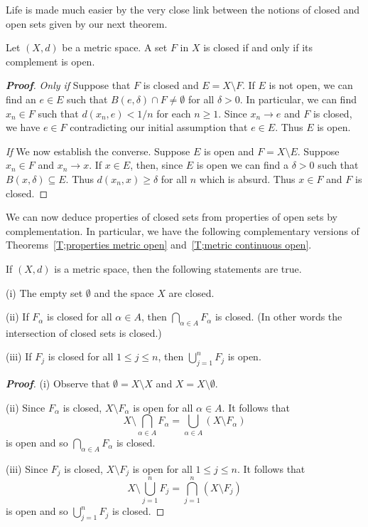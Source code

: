 Life is made much easier by the very close link between
the notions of closed and open sets given by our next theorem.


\begin{theorem}\label{T;closed complements open}
Let $(X,d)$ be a metric space. A set $F$ in $X$
is closed if and only if its complement is open.
\end{theorem}
\begin{proof}[\bf Proof]\emph{Only if} Suppose that
$F$ is closed and $E=X\setminus F$.
If $E$ is not open, we can find an $e\in E$ such that
$B(e,\delta)\cap F\neq\emptyset$ for all $\delta>0$.
In particular, we can find $x_{n}\in F$ such that $d(x_{n},e)<1/n$
for each $n\geq 1$. Since $x_{n}\rightarrow e$ and $F$ is closed,
we have $e\in F$ contradicting our initial assumption that
$e\in E$. Thus $E$ is open.

\emph{If} We now establish the converse. Suppose $E$ is open
and $F=X\setminus E$. Suppose $x_{n}\in F$ and $x_{n}\rightarrow x$.
If $x\in E$, then, since $E$ is open
 we can find a $\delta>0$ such that $B(x,\delta)\subseteq E$.
Thus $d(x_{n},x)\geq \delta$ for all $n$ which is absurd.
Thus $x\in F$ and $F$ is closed.
\end{proof}

We can now deduce properties of closed sets from properties of open sets by complementation. In particular, we have the following complementary versions of Theorems~\ref{T;properties metric open} and~\ref{T;metric continuous open}.




\begin{theorem}\label{T;properties metric closed} 
If $(X,d)$ is a metric space, 
then the following statements are true.

(i) The empty set $\emptyset$ and the space $X$ are closed.

(ii) If $F_{\alpha}$ is closed for all $\alpha\in A$, then
$\bigcap_{\alpha\in A} F_{\alpha}$ is closed. (In other words
the intersection of closed sets is closed.)

(iii) If $F_{j}$ is closed for all $1\leq j\leq n$, then
$\bigcup_{j=1}^{n} F_{j}$ is open.
\end{theorem}
\begin{proof}[\bf Proof] (i) Observe that $\emptyset=X\setminus X$
and $X=X\setminus \emptyset$.

(ii) Since $F_{\alpha}$ is closed, $X\setminus F_{\alpha}$
is open for all $\alpha\in A$. It follows that
\[X\setminus \bigcap_{\alpha\in A} F_{\alpha}
=\bigcup_{\alpha\in A}(X\setminus F_{\alpha})\]
is open and so  $\bigcap_{\alpha\in A} F_{\alpha}$ is closed.

(iii) Since $F_{j}$ is closed, $X\setminus F_{j}$
is open for all $1\leq j\leq n$. It follows that
\[X\setminus \bigcup_{j=1}^{n} F_{j}
=\bigcap_{j=1}^{n}(X\setminus F_{j})\]
is open and so  $\bigcup_{j=1}^{n} F_{j}$ is closed.
\end{proof}


